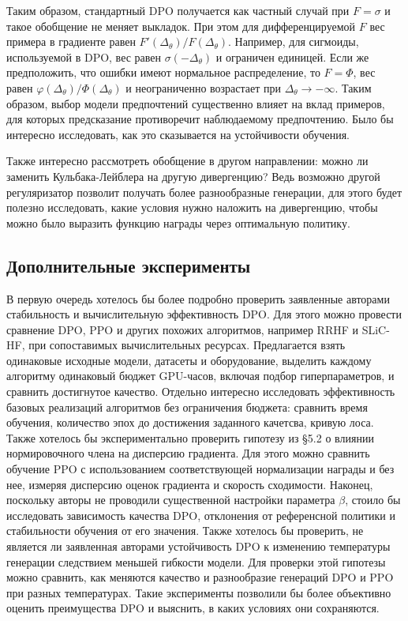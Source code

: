 \documentclass[11pt,a4paper]{article}
\theoremstyle{remark}
\begin{document}
Таким образом, стандартный DPO получается как частный случай при \(F=\sigma\) и такое обобщение не меняет выкладок. При этом для дифференцируемой \(F\) вес примера в градиенте равен \(F'(\Delta_\theta)/F(\Delta_\theta)\). Например, для сигмоиды, используемой в DPO, вес равен $\sigma(-\Delta_\theta)$ и ограничен единицей. Если же предположить, что ошибки имеют нормальное распределение, то $F=\Phi$, вес равен $\varphi(\Delta_\theta)/\Phi(\Delta_\theta)$ и неограниченно возрастает при $\Delta_\theta\to-\infty$. Таким образом, выбор модели предпочтений существенно влияет на вклад примеров, для которых предсказание противоречит наблюдаемому предпочтению. Было бы интересно исследовать, как это сказывается на устойчивости обучения.

Также интересно рассмотреть обобщение в другом направлении: можно ли заменить Кульбака-Лейблера на другую дивергенцию? Ведь возможно другой регуляризатор позволит получать более разнообразные генерации, для этого будет полезно исследовать, какие условия нужно наложить на дивергенцию, чтобы можно было выразить функцию награды через оптимальную политику.

\subsection{Дополнительные эксперименты}

В первую очередь хотелось бы более подробно проверить заявленные авторами стабильность и вычислительную эффективность DPO. Для этого можно провести сравнение DPO, PPO и других похожих алгоритмов, например RRHF и SLiC-HF, при сопоставимых вычислительных ресурсах. Предлагается взять одинаковые исходные модели, датасеты и оборудование, выделить каждому алгоритму одинаковый бюджет GPU-часов, включая подбор гиперпараметров, и сравнить достигнутое качество. Отдельно интересно исследовать эффективность базовых реализаций алгоритмов без ограничения бюджета: сравнить время обучения, количество эпох до достижения заданного качетсва, кривую лоса. Также хотелось бы экспериментально проверить гипотезу из \S 5.2 о влиянии нормировочного члена на дисперсию градиента. Для этого можно сравнить обучение PPO с использованием соответствующей нормализации награды и без нее, измеряя дисперсию оценок градиента и скорость сходимости. Наконец, поскольку авторы не проводили существенной настройки параметра $\beta$, стоило бы исследовать зависимость качества DPO, отклонения от референсной политики и стабильности обучения от его значения. Также хотелось бы проверить, не является ли заявленная авторами устойчивость DPO к изменению температуры генерации следствием меньшей гибкости модели. Для проверки этой гипотезы можно сравнить, как меняются качество и разнообразие генераций DPO и PPO при разных температурах. Такие эксперименты позволили бы более объективно оценить преимущества DPO и выяснить, в каких условиях они сохраняются. 
\end{document}
